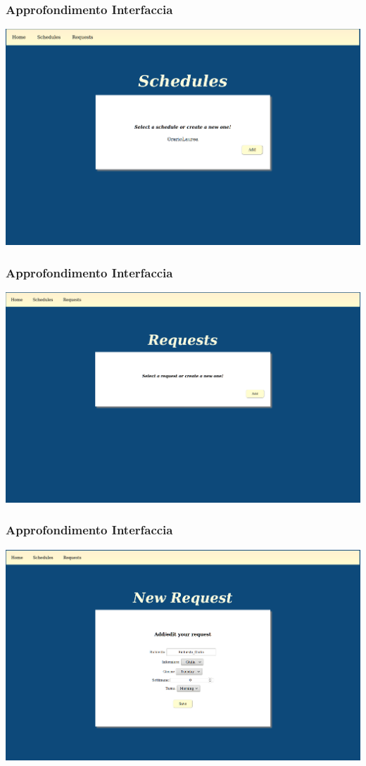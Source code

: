 \documentclass[xcolor={dvipsnames, table}]{beamer}
\begin{document}
\begin{frame}[noframenumbering]
\frametitle{Approfondimento Interfaccia}
\begin{center}
\includegraphics[width=\linewidth]{img/Schermate/S1.png}
\end{center}
\end{frame}

\begin{frame}[noframenumbering]
\frametitle{Approfondimento Interfaccia}
\begin{center}
\includegraphics[width=\linewidth]{img/Schermate/S3.png}
\end{center}
\end{frame}

\begin{frame}[noframenumbering]
\frametitle{Approfondimento Interfaccia}
\begin{center}
\includegraphics[width=\linewidth]{img/Schermate/S4.png}
\end{center}
\end{frame}
\end{document}
